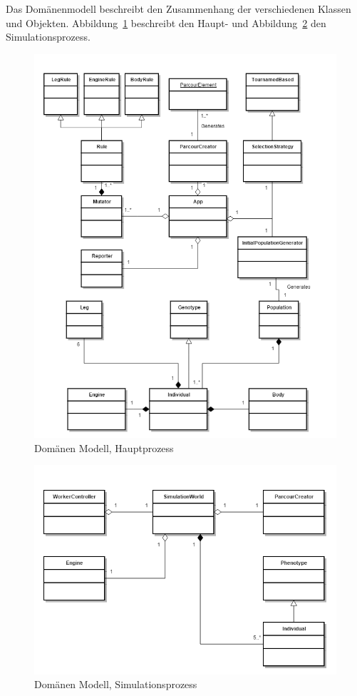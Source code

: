       Das Domänenmodell beschreibt den Zusammenhang der verschiedenen Klassen und Objekten.
      Abbildung~\ref{fig:mainProcess} beschreibt den Haupt- und Abbildung~\ref{fig:simulationProcess} den Simulationsprozess.
      \begin{figure}[H]
        \includegraphics[scale=0.6]{graphics/main_process}
        \caption{Domänen Modell, Hauptprozess\label{fig:mainProcess}}
      \end{figure}
      \begin{figure}[H]
        \includegraphics[scale=0.6]{graphics/simulation_process}
        \caption{Domänen Modell, Simulationsprozess\label{fig:simulationProcess}}
      \end{figure}

